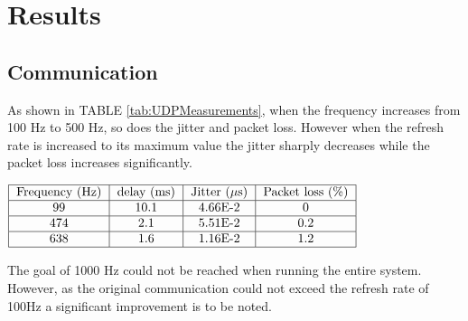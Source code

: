 \section{Results}

\subsection{Communication}

As shown in TABLE \ref{tab:UDPMeasurements}, when the frequency increases from 100 Hz to 500 Hz, so does the jitter and packet loss. However when the refresh rate is increased to its maximum value the jitter sharply decreases while the packet loss increases significantly.

\begin{center}
  $\begin{tabular}{|c|c|c|c|c|c|}
    \hline
    \text{Frequency (Hz)} & \text{delay (ms)} & \text{Jitter ($\mu$s)} & \text{Packet loss (\%)}\\
    \hline
    99 & 10.1 & 4.66E-2 & 0 \\
    \hline
    474 & 2.1 & 5.51E-2 & 0.2 \\
    \hline
    638 & 1.6 & 1.16E-2 & 1.2 \\
    \hline
  \end{tabular}$
  \label{tab:UDPMeasurements}
\end{center}
The goal of 1000 Hz could not be reached when running the entire system. However, as the original communication could not exceed the refresh rate of 100Hz a significant improvement is to be noted.

